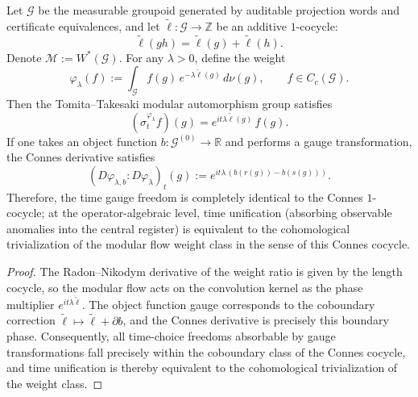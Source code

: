 \begin{theorem}\label{thm:xi-modular-flow-equals-time-cocycle}
Let \(\mathcal G\) be the measurable groupoid generated by auditable projection words and certificate equivalences, and let \(\widetilde\ell:\mathcal G\to\mathbb Z\) be an additive \(1\)-cocycle:
\[
\widetilde\ell(gh)=\widetilde\ell(g)+\widetilde\ell(h).
\]
Denote \(\mathcal M:=W^\ast(\mathcal G)\).
For any \(\lambda>0\), define the weight
\[
\varphi_\lambda(f):=\int_{\mathcal G} f(g)\,e^{-\lambda\widetilde\ell(g)}\,d\nu(g),\qquad f\in C_c(\mathcal G).
\]
Then the Tomita--Takesaki modular automorphism group satisfies
\[
(\sigma_t^{\varphi_\lambda}f)(g)=e^{it\lambda\widetilde\ell(g)}\,f(g).
\]
If one takes an object function \(b:\mathcal G^{(0)}\to\mathbb R\) and performs a gauge transformation, the Connes derivative satisfies
\[
(D\varphi_{\lambda,b}:D\varphi_\lambda)_t(g)
:=e^{it\lambda\,(b(r(g))-b(s(g)))}.
\]
Therefore, the time gauge freedom is completely identical to the Connes \(1\)-cocycle; at the operator-algebraic level, time unification (absorbing observable anomalies into the central register) is equivalent to the cohomological trivialization of the modular flow weight class in the sense of this Connes cocycle.
\end{theorem}

\begin{proof}
The Radon--Nikodym derivative of the weight ratio is given by the length cocycle, so the modular flow acts on the convolution kernel as the phase multiplier \(e^{it\lambda\widetilde\ell}\).
The object function gauge corresponds to the coboundary correction \(\widetilde\ell\mapsto \widetilde\ell+\partial b\), and the Connes derivative is precisely this boundary phase.
Consequently, all time-choice freedoms absorbable by gauge transformations fall precisely within the coboundary class of the Connes cocycle, and time unification is thereby equivalent to the cohomological trivialization of the weight class.
\end{proof}

